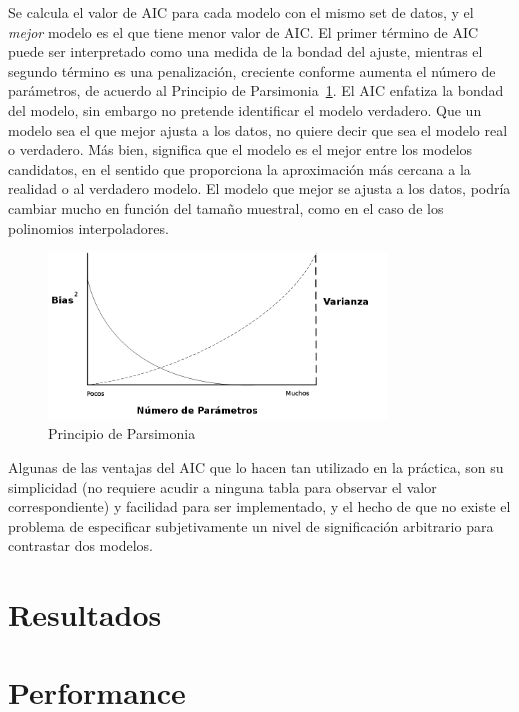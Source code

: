 Se calcula el valor de AIC para cada modelo con el mismo set de datos, y
el \emph{mejor} modelo es el que tiene menor valor de AIC.
El primer término de AIC puede ser interpretado como una medida de la bondad
del ajuste, mientras el segundo término es una penalización, creciente conforme
aumenta el número de parámetros, de acuerdo al Principio de
Parsimonia~\ref{fig:parsimony}. El AIC enfatiza la bondad del modelo, sin
embargo no pretende identificar el modelo verdadero. Que un modelo sea el que
mejor ajusta a los datos, no quiere decir que sea el modelo real o verdadero.
Más bien, significa que el modelo es el mejor entre los modelos candidatos, en
el sentido que proporciona la aproximación más cercana a la realidad o al
verdadero modelo. El modelo que mejor se ajusta a los datos, podría cambiar
mucho en función del tamaño muestral, como en el caso de los polinomios
interpoladores. 

\begin{figure}[h!t]
    \begin{center}
        \includegraphics[width=0.8\textwidth]{images/parsimony}
        \caption{Principio de Parsimonia}
        \label{fig:parsimony}
    \end{center}
\end{figure}



Algunas de las ventajas del AIC que lo hacen tan utilizado en la práctica, son
su simplicidad (no requiere acudir a ninguna tabla para observar el valor
correspondiente) y facilidad para ser implementado, y el hecho de que no existe
el problema de especificar subjetivamente un nivel de significación arbitrario
para contrastar dos modelos.


\section{Resultados}

\section{Performance}

